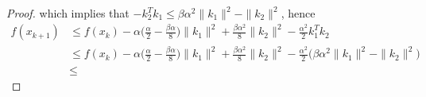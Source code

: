 \begin{proof}
which implies that $ - k_2^T k_1 \leq \beta \alpha^2 \|k_1\|^2 - \|k_2\|^2$, hence
\begin{equation}
\begin{aligned}
f(x_{k+1}) & \leq f(x_k) - \alpha \big(\frac{\alpha}{2} - \frac{\beta \alpha}{8}\big)\|k_1\|^2 + \frac{\beta \alpha^2}{8}\|k_2\|^2 - \frac{\alpha^2}{2} k_1^T k_2 \\
& \leq f(x_k) - \alpha \big(\frac{\alpha}{2} - \frac{\beta \alpha}{8}\big)\|k_1\|^2 + \frac{\beta \alpha^2}{8}\|k_2\|^2 - \frac{\alpha^2}{2} \big( \beta \alpha^2 \|k_1\|^2 - \|k_2\|^2 \big) \\
& \leq
\end{aligned}
\end{equation}







\end{proof}
